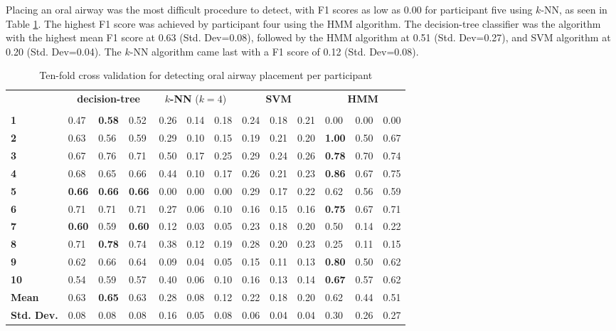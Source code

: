 \par Placing an oral airway was the most difficult procedure to detect, with F1 scores as low as 0.00 for participant five using $k$-NN, as seen in Table \ref{tab:o:ml}. The highest F1 score was achieved by participant four using the HMM algorithm. The decision-tree classifier was the algorithm with the highest mean F1 score at 0.63 (Std. Dev=0.08), followed by the HMM algorithm at 0.51 (Std. Dev=0.27), and SVM algorithm at 0.20 (Std. Dev=0.04). The $k$-NN algorithm came last with a F1 score of 0.12 (Std. Dev=0.08).
\begin{table}[h]
	\centering
	\begin{tabular}{lllllllllllll}
		\multirow{2}{*}{\rotatebox[origin=c]{45}{\textbf{Participant}}} & \multicolumn{3}{c}{\textbf{decision-tree}} & \multicolumn{3}{c}{\textbf{$k$-NN} ($k=4$)} & \multicolumn{3}{c}{\textbf{SVM}} & \multicolumn{3}{c}{\textbf{HMM}} \\
		& \rot{Precision}     & \rot{Recall}    & \rot{F1}    & \rot{Precision}     & \rot{Recall}    & \rot{F1}  & \rot{Precision}     & \rot{Recall}    & \rot{F1} & \rot{Precision}     & \rot{Recall}    & \rot{F1} \\
		\textbf{1}   & 0.47 & \textbf{0.58} & 0.52 & 0.26 & 0.14 & 0.18 & 0.24 & 0.18 & 0.21 & 0.00 & 0.00 & 0.00 \\
		\textbf{2}   & 0.63 & 0.56 & 0.59 & 0.29 & 0.10 & 0.15 & 0.19 & 0.21 & 0.20 & \textbf{1.00} & 0.50 & 0.67 \\
		\textbf{3}   & 0.67 & 0.76 & 0.71 & 0.50 & 0.17 & 0.25 & 0.29 & 0.24 & 0.26 & \textbf{0.78} & 0.70 & 0.74 \\
		\textbf{4}   & 0.68 & 0.65 & 0.66 & 0.44 & 0.10 & 0.17 & 0.26 & 0.21 & 0.23 & \textbf{0.86} & 0.67 & 0.75 \\
		\textbf{5}   & \textbf{0.66} & \textbf{0.66} & \textbf{0.66} & 0.00 & 0.00 & 0.00 & 0.29 & 0.17 & 0.22 & 0.62 & 0.56 & 0.59 \\
		\textbf{6}   & 0.71 & 0.71 & 0.71 & 0.27 & 0.06 & 0.10 & 0.16 & 0.15 & 0.16 & \textbf{0.75} & 0.67 & 0.71 \\
		\textbf{7}   & \textbf{0.60} & 0.59 & \textbf{0.60} & 0.12 & 0.03 & 0.05 & 0.23 & 0.18 & 0.20 & 0.50 & 0.14 & 0.22 \\
		\textbf{8}   & 0.71 & \textbf{0.78} & 0.74 & 0.38 & 0.12 & 0.19 & 0.28 & 0.20 & 0.23 & 0.25 & 0.11 & 0.15 \\
		\textbf{9}   & 0.62 & 0.66 & 0.64 & 0.09 & 0.04 & 0.05 & 0.15 & 0.11 & 0.13 & \textbf{0.80} & 0.50 & 0.62 \\
		\textbf{10} & 0.54 & 0.59 & 0.57 & 0.40 & 0.06 & 0.10 & 0.16 & 0.13 & 0.14 & \textbf{0.67} & 0.57 & 0.62 \\
		\hline
		\textbf{Mean} & 0.63 & \textbf{0.65} & 0.63 & 0.28 & 0.08 & 0.12 & 0.22 & 0.18 & 0.20 & 0.62 & 0.44 & 0.51 \\
		\textbf{Std. Dev.} & 0.08 & 0.08 & 0.08 & 0.16 & 0.05 & 0.08 & 0.06 & 0.04 & 0.04 & 0.30 & 0.26 & 0.27 \\
	\end{tabular}
	\caption{Ten-fold cross validation for detecting oral airway placement per participant}
	\label{tab:o:ml}
\end{table}

